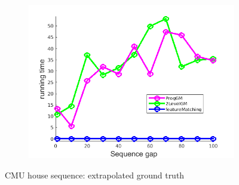 \begin{figure}[h]
\begin{subfigure}[b]{0.3\textwidth}
	\end{subfigure} 
	\begin{subfigure}[b]{0.3\textwidth}
		\centering
		\includegraphics[scale=0.25]{"chapter3/fig/HouseSeq/anchor_descr/using_cpd_afftrafo/solution/performance/time"}  
	\end{subfigure} 	
	\caption{CMU house sequence: extrapolated ground truth}
\end{figure}
\FloatBarrier
\vspace{-20pt}

